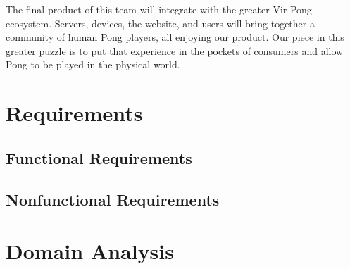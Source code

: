 \documentclass[12pt]{article}
\begin{document}
The final product of this team will integrate with the greater Vir-Pong ecosystem.  Servers, devices, the website, and users will bring together a community of human Pong players, all enjoying our product.  Our piece in this greater puzzle is to put that experience in the pockets of consumers and allow Pong to be played in the physical world.


\section{Requirements}
\subsection{Functional Requirements}

\subsection{Nonfunctional Requirements}


\section{Domain Analysis}
\end{document}
